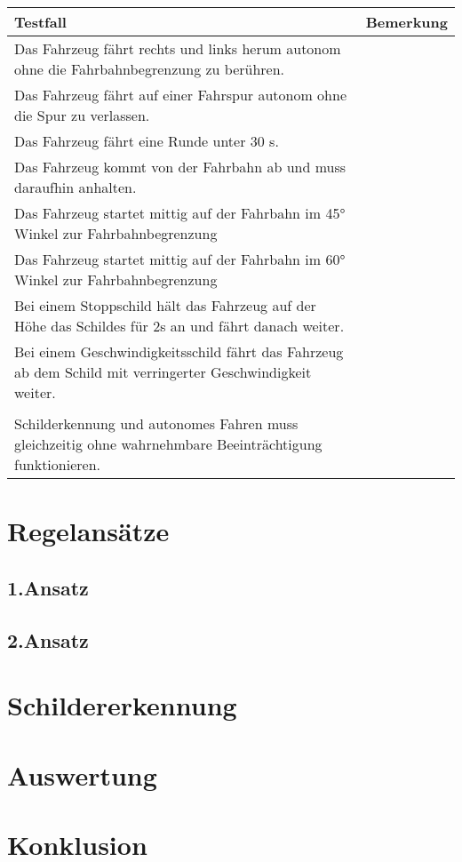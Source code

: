 	\begin{table}[h]
		\renewcommand{\arraystretch}{1.5}
		\begin{tabular}{|p{}|p{}|}
			\hline
			Testfall& Bemerkung\\
			\hline
			Das Fahrzeug f\"ahrt rechts und links herum autonom ohne die Fahrbahnbegrenzung zu ber\"uhren.& \\
			\hline
			Das Fahrzeug f\"ahrt auf einer Fahrspur autonom ohne die Spur zu verlassen. & \\
			\hline
			Das Fahrzeug f\"ahrt eine Runde unter 30 s.& \\
			\hline
			Das Fahrzeug kommt von der Fahrbahn ab und muss daraufhin anhalten.& \\
			\hline
			Das Fahrzeug startet mittig auf der Fahrbahn im \ang{45} Winkel zur Fahrbahnbegrenzung & \\
			\hline
			Das Fahrzeug startet mittig auf der Fahrbahn im \ang{60} Winkel zur Fahrbahnbegrenzung& \\
			\hline
			Bei einem Stoppschild h\"alt das Fahrzeug auf der H\"ohe das Schildes f\"ur 2s an und f\"ahrt danach weiter.& \\
			\hline
			Bei einem Geschwindigkeitsschild f\"ahrt das Fahrzeug ab dem Schild mit verringerter Geschwindigkeit weiter.& \\
			\hline
			& \\
			\hline
			Schilderkennung und autonomes Fahren muss gleichzeitig ohne wahrnehmbare Beeintr\"achtigung funktionieren.& \\
			\hline
			
		\end{tabular}
	\end{table}
  
\section{Regelans{\"a}tze}
  
\subsection{1.Ansatz}
  
\subsection{2.Ansatz}
  
\section{Schildererkennung}
  
\section{Auswertung}
  
\section{Konklusion}